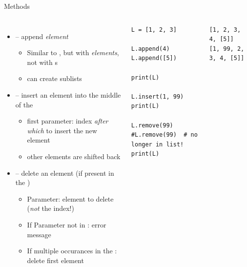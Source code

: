
\begin{frame}[fragile]{Methods}
%
\vspace{-15pt}
\begin{columns}[t]
\begin{itemize}
\item {} -- append \emph{element}
	\begin{itemize}
	\item Similar to \inPy{+=}, but with \emph{elements}, not with s
	\item can create sublists
	\end{itemize}
\item {} -- insert an element into the middle of the 
	\begin{itemize}
	\item first parameter: index \emph{after which} to insert the new element
	\item other elements are shifted back
	\end{itemize}
\item {} -- delete an element (if present in the )
	\begin{itemize}
	\item Parameter: element to delete (\emph{not} the index!)
	\item If Parameter not in : error message
	\item If multiple occurances in the : delete first element
	\end{itemize}
\end{itemize}
%
\vspace{-40pt}
\begin{codebox}[Examples]
\begin{verbatim}
L = [1, 2, 3]

L.append(4)
L.append([5])

print(L)

L.insert(1, 99)
print(L)

L.remove(99)
#L.remove(99)  # no longer in list!
print(L)
\end{verbatim}
\end{codebox}
%
\begin{cmdbox}[Output]%
\begin{verbatim}
[1, 2, 3, 4, [5]]
[1, 99, 2, 3, 4, [5]]
\end{verbatim}
\end{cmdbox}
\end{columns}
%
\end{frame}

